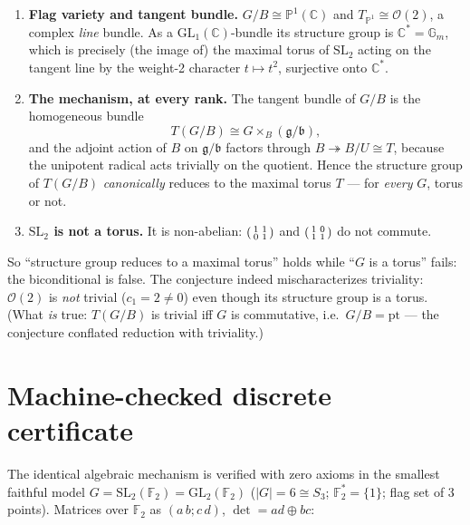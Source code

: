 \documentclass[11pt]{article}
\begin{document}
\begin{enumerate}
\item \textbf{Flag variety and tangent bundle.} $G/B \cong \mathbb{P}^1(\mathbb{C})$ and $T_{\mathbb{P}^1} \cong \mathcal{O}(2)$, a complex \emph{line} bundle. As a $\mathrm{GL}_1(\mathbb{C})$-bundle its structure group is $\mathbb{C}^*=\mathbb{G}_m$, which is precisely (the image of) the maximal torus of $\mathrm{SL}_2$ acting on the tangent line by the weight-2 character $t \mapsto t^2$, surjective onto $\mathbb{C}^*$.
\item \textbf{The mechanism, at every rank.} The tangent bundle of $G/B$ is the homogeneous bundle
\[
T(G/B) \cong G \times_B (\mathfrak{g}/\mathfrak{b}),
\]
and the adjoint action of $B$ on $\mathfrak{g}/\mathfrak{b}$ factors through $B \twoheadrightarrow B/U \cong T$, because the unipotent radical acts trivially on the quotient. Hence the structure group of $T(G/B)$ \emph{canonically} reduces to the maximal torus $T$ --- for \emph{every} $G$, torus or not.
\item \textbf{$\mathrm{SL}_2$ is not a torus.} It is non-abelian: $\begin{psmallmatrix}1&1\\0&1\end{psmallmatrix}$ and $\begin{psmallmatrix}1&0\\1&1\end{psmallmatrix}$ do not commute.
\end{enumerate}

So ``structure group reduces to a maximal torus'' holds while ``$G$ is a torus'' fails: the biconditional is false. The conjecture indeed mischaracterizes triviality: $\mathcal{O}(2)$ is \emph{not} trivial ($c_1 = 2 \neq 0$) even though its structure group is a torus. (What \emph{is} true: $T(G/B)$ is trivial iff $G$ is commutative, i.e.\ $G/B = \mathrm{pt}$ --- the conjecture conflated reduction with triviality.)

\section{Machine-checked discrete certificate}

The identical algebraic mechanism is verified with zero axioms in the smallest faithful model $G=\mathrm{SL}_2(\mathbb{F}_2)=\mathrm{GL}_2(\mathbb{F}_2)$ ($|G|=6\cong S_3$; $\mathbb{F}_2^*=\{1\}$; flag set of 3 points). Matrices over $\mathbb{F}_2$ as $(a\,b; c\, d)$, $\det = ad\oplus bc$:
\end{document}
